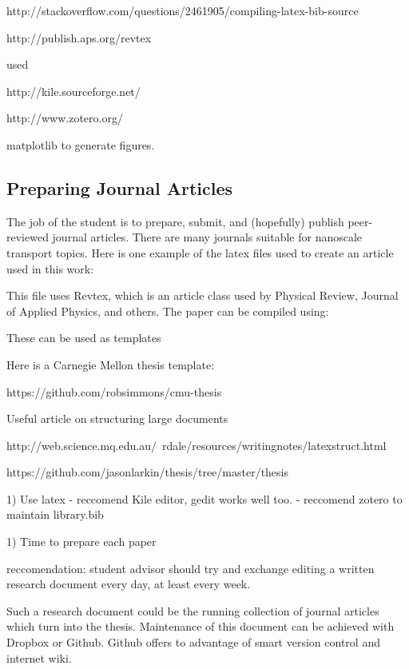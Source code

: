 http://stackoverflow.com/questions/2461905/compiling-latex-bib-source

http://publish.aps.org/revtex

used 

http://kile.sourceforge.net/

http://www.zotero.org/

matplotlib to generate figures. 

\subsection{Preparing Journal Articles}

The job of the student is to prepare, submit, and (hopefully) publish 
peer-reviewed journal articles. There are many journals suitable for 
nanoscale transport topics.  Here is one example of the latex files 
used to create an article used in this work:

This file uses Revtex, which is an article class used by Physical Review, 
Journal of Applied Physics, and others. The paper can be compiled using:



These can be used as templates



Here is a Carnegie Mellon thesis template:

https://github.com/robsimmons/cmu-thesis

Useful article on structuring large documents

http://web.science.mq.edu.au/~rdale/resources/writingnotes/latexstruct.html

https://github.com/jasonlarkin/thesis/tree/master/thesis


1) Use latex
- reccomend Kile editor, gedit works well too. 
- reccomend zotero to maintain library.bib

1) Time to prepare each paper

reccomendation: student advisor should try and exchange editing a written 
research document every day, at least every week.  

Such a research document could be the running 
collection of journal articles which turn into the thesis. Maintenance 
of this document can be achieved with Dropbox or Github.  Github 
offers to advantage of smart version control and internet wiki. 

